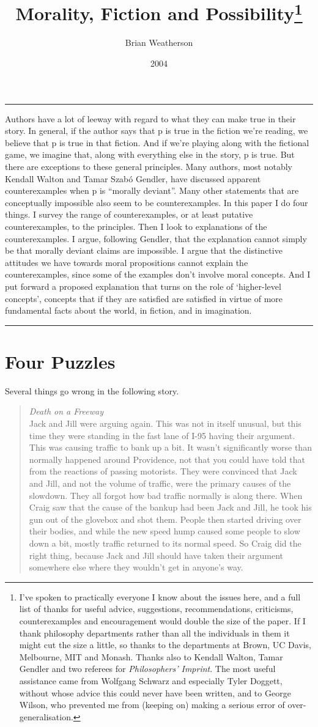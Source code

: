 \documentclass[
  10pt,
  letterpaper,
  DIV=11,
  numbers=noendperiod,
  twoside]{scrartcl}
\title{Morality, Fiction and Possibility\thanks{I've spoken to
practically everyone I know about the issues here, and a full list of
thanks for useful advice, suggestions, recommendations, criticisms,
counterexamples and encouragement would double the size of the paper. If
I thank philosophy departments rather than all the individuals in them
it might cut the size a little, so thanks to the departments at Brown,
UC Davis, Melbourne, MIT and Monash. Thanks also to Kendall Walton,
Tamar Gendler and two referees for \emph{Philosophers' Imprint}. The
most useful assistance came from Wolfgang Schwarz and especially Tyler
Doggett, without whose advice this could never have been written, and to
George Wilson, who prevented me from (keeping on) making a serious error
of over-generalisation.}}
\author{Brian Weatherson}
\date{2004}
\renewenvironment{abstract}
 {\vspace{-1.25cm}
 \quotation\small\noindent\rule{\linewidth}{.5pt}\par\smallskip
 \noindent }
 {\par\noindent\rule{\linewidth}{.5pt}\endquotation}
\begin{document}
\maketitle
\begin{abstract}
Authors have a lot of leeway with regard to what they can make true in
their story. In general, if the author says that p is true in the
fiction we're reading, we believe that p is true in that fiction. And if
we're playing along with the fictional game, we imagine that, along with
everything else in the story, p is true. But there are exceptions to
these general principles. Many authors, most notably Kendall Walton and
Tamar Szabó Gendler, have discussed apparent counterexamples when p is
``morally deviant''. Many other statements that are conceptually
impossible also seem to be counterexamples. In this paper I do four
things. I survey the range of counterexamples, or at least putative
counterexamples, to the principles. Then I look to explanations of the
counterexamples. I argue, following Gendler, that the explanation cannot
simply be that morally deviant claims are impossible. I argue that the
distinctive attitudes we have towards moral propositions cannot explain
the counterexamples, since some of the examples don't involve moral
concepts. And I put forward a proposed explanation that turns on the
role of `higher-level concepts', concepts that if they are satisfied are
satisfied in virtue of more fundamental facts about the world, in
fiction, and in imagination.
\end{abstract}

\section{Four Puzzles}\label{four-puzzles}

Several things go wrong in the following story.

\begin{quote}
\emph{Death on a Freeway}\\
Jack and Jill were arguing again. This was not in itself unusual, but
this time they were standing in the fast lane of I-95 having their
argument. This was causing traffic to bank up a bit. It wasn't
significantly worse than normally happened around Providence, not that
you could have told that from the reactions of passing motorists. They
were convinced that Jack and Jill, and not the volume of traffic, were
the primary causes of the slowdown. They all forgot how bad traffic
normally is along there. When Craig saw that the cause of the bankup had
been Jack and Jill, he took his gun out of the glovebox and shot them.
People then started driving over their bodies, and while the new speed
hump caused some people to slow down a bit, mostly traffic returned to
its normal speed. So Craig did the right thing, because Jack and Jill
should have taken their argument somewhere else where they wouldn't get
in anyone's way.
\end{quote}
\end{document}
